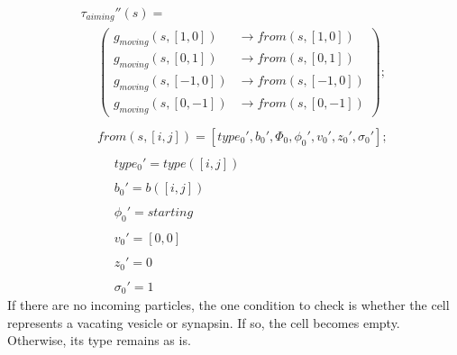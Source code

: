 \documentclass{acm_proc_article-sp}
\begin{document}
\begin{displaymath} \begin{array}{l}
\tau_{aiming}''(s) = \\
\hspace{16pt} \left( \begin{array}{ll} g_{moving}(s, [1, 0]) & \rightarrow from(s, [1, 0]) \\
                                       g_{moving}(s, [0, 1]) & \rightarrow from(s, [0, 1]) \\
                                       g_{moving}(s, [-1, 0]) & \rightarrow from(s, [-1, 0]) \\
                                       g_{moving}(s, [0, -1]) & \rightarrow from(s, [0, -1]) \end{array} \right); \\
\\
\hspace{16pt} from(s, [i, j]) = [type_0', b_0', \Phi_0, \phi_0', v_0', z_0', \sigma_0']; \\
\\
\hspace{16pt} \hspace{16pt} type_0' = type([i, j]) \\
\\
\hspace{16pt} \hspace{16pt} b_0' = b([i, j]) \\
\\
\hspace{16pt} \hspace{16pt} \phi_0' = starting \\
\\
\hspace{16pt} \hspace{16pt} v_0' = [0, 0] \\
\\
\hspace{16pt} \hspace{16pt} z_0' = 0 \\
\\
\hspace{16pt} \hspace{16pt} \sigma_0' = 1
\end{array} \end{displaymath}
If there are no incoming particles, the one
condition to check is whether the cell represents 
a vacating vesicle or synapsin.  If so, the
cell becomes empty.  Otherwise, its type 
remains as is.
\end{document}
